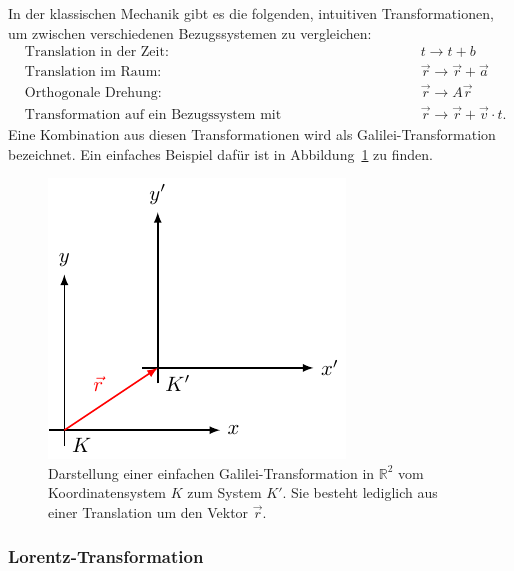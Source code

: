 In der klassischen Mechanik gibt es die folgenden,
intuitiven Transformationen, um zwischen verschiedenen Bezugssystemen
zu vergleichen:
\[
\begin{aligned}
    &\text{Translation in der Zeit: } && t \rightarrow t + b \\
    &\text{Translation im Raum: } && \vec{r} \rightarrow \vec{r} + \vec{a} \\
    &\text{Orthogonale Drehung: } && \vec{r} \rightarrow A \vec{r} \\
    &\text{Transformation auf ein Bezugssystem mit Relativgeschwindigkeit: } && \vec{r} \rightarrow \vec{r} + \vec{v} \cdot t .
\end{aligned}
\]
Eine Kombination aus diesen Transformationen wird als Galilei-Transformation bezeichnet.
Ein einfaches Beispiel dafür ist in Abbildung~\ref{relativ:fig:galilei-trafo} zu finden.
\begin{figure}
    \centering
    \includegraphics{papers/relativ/tikz/galilei_trafo.pdf}
    \caption{Darstellung einer einfachen Galilei-Transformation in \(\mathbb{R}^2\)
    vom Koordinatensystem \(K\) zum System \(K'\).
    Sie besteht lediglich aus einer Translation um den Vektor \(\vec{r}\).
    \label{relativ:fig:galilei-trafo}}
\end{figure}

\subsubsection{Lorentz-Transformation 
\label{relativ:section:lorentz-trafo}}

